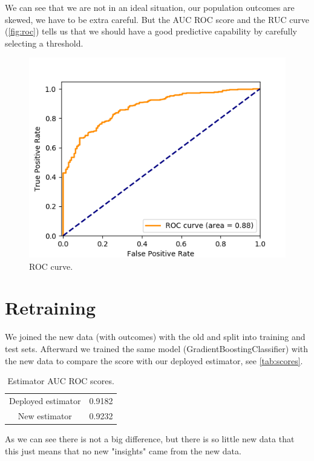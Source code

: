 \documentclass[a4paper]{article}
\begin{document}
    We can see that we are not in an ideal situation, our population outcomes
    are skewed, we have to be extra careful.
    But the AUC ROC score and the RUC curve (\vref{fig:roc}) tells us that we
    should have a good predictive capability by carefully selecting a
    threshold.

    \begin{figure}[!ht]
        \caption{ROC curve.}
        \label{fig:roc}
        \centering
        \includegraphics[width=\textwidth]{./img/roc.png}
    \end{figure}

    \section{Retraining}
    \label{sec:retrain}

    We joined the new data (with outcomes) with the old and split into
    training and test sets.
    Afterward we trained the same model (GradientBoostingClassifier) with the
    new data to compare the score with our deployed estimator, see
    \vref{tab:scores}.
    \begin{table}[!h]
        \caption{Estimator AUC ROC scores.}
        \label{tab:scores}

        \centering
        \begin{tabular}{cc}
            Deployed estimator & 0.9182 \\
            New estimator & 0.9232 \\
        \end{tabular}
    \end{table}

    As we can see there is not a big difference, but there is so little new
    data that this just means that no new "insights" came from the new data.

    \clearpage
    \appendix
    

%
%
\end{document}

